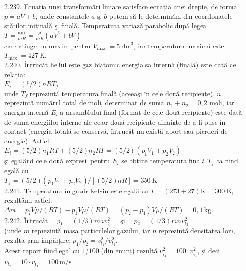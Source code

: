 2.239. Ecuația unei transformări liniare satisface ecuația unei drepte, de forma $p=a V+b$, unde constantele $a$ şi $b$ putem să le determinăm din coordonatele stărilor iniținală şi finală. Temperatura variază parabolic după legea\\ $T=\frac{\mu p V}{m R}=\frac{\mu}{m R}\left(a V^{2}+b V\right)$\\ care atinge un maxim pentru $V_{\text {max }}=5 \mathrm{~dm}^{3}$, iar temperatura maximă este $T_{\text {max }}=427 \mathrm{~K}$.\\

2.240. Întrucât heliul este gaz biatomic energia sa internă (finală) este dată de relația:\\ $E_{i}=(5 / 2) n R T_{f}$\\ unde $T_{f}$ reprezintă temperatura finală (aceeaşi în cele două recipiente), $n$ reprezintă numărul total de moli, determinat de suma $n_{1}+n_{2}=0,2$ moli, iar energia internă $E_{i}$ a ansamblului final (format de cele două recipiente) este dată de suma energiilor interne ale celor două recipiente dinainte de a fi puse în contact (energia totală se conservă, întrucât nu există aport sau pierderi de energie). Astfel:\\ $E_{i}=(5 / 2) n_{1} R T+(5 / 2) n_{2} R T=(5 / 2)\left(p_{1} V_{1}+p_{2} V_{2}\right)$\\ şi egalând cele două expresii pentru $E_{i}$ se obține temperatura finală $T_{f}$ ca fiind egală cu\\ $T_{f}=(5 / 2)\left(p_{1} V_{1}+p_{2} V_{2}\right) /[(5 / 2) n R]=350 \mathrm{~K}$\\

2.241. Temperatura în grade kelvin este egală cu $T=(273+27) \mathrm{K}=300 \mathrm{~K}$, rezultând astfel:\\ $\Delta m=p_{2} V \mu /(R T)-p_{1} V \mu /(R T)=\left(p_{2}-p_{1}\right) V \mu /(R T)=0,1 \mathrm{~kg}$.\\

2.242. Întrucât $\quad p_{1}=(1 / 3) m n v_{t_{1}}^{2} \quad$ şi $\quad p_{2}=(1 / 3) m n v_{t_{2}}^{2}$\\ (unde $m$ reprezintă masa particulelor gazului, iar $n$ reprezintă densitatea lor), rezultă prin împărțire: $p_{1} / p_{2}=v_{t_{1}}^{2} / v_{t_{2}}^{2}$.\\ Acest raport fiind egal cu $1 / 100$ (din enunț) rezultă $v_{i_{2}}^{2}=100 \cdot v_{i_{1}}^{2}$, şi deci\\ $v_{t_{2}}=10 \cdot v_{t_{1}}=100 \mathrm{~m} / \mathrm{s}$\\

